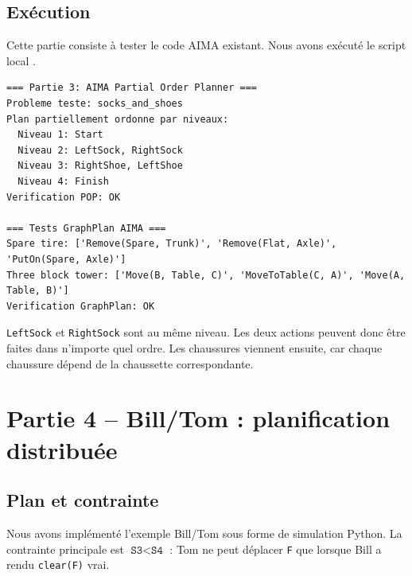 \documentclass[11pt,a4paper]{report}
\begin{document}
\quad{}\quad{}\quad{}

\section{Exécution}

Cette partie consiste à tester le code AIMA existant. Nous avons exécuté le script local .

\begin{lstlisting}
=== Partie 3: AIMA Partial Order Planner ===
Probleme teste: socks_and_shoes
Plan partiellement ordonne par niveaux:
  Niveau 1: Start
  Niveau 2: LeftSock, RightSock
  Niveau 3: RightShoe, LeftShoe
  Niveau 4: Finish
Verification POP: OK

=== Tests GraphPlan AIMA ===
Spare tire: ['Remove(Spare, Trunk)', 'Remove(Flat, Axle)', 'PutOn(Spare, Axle)']
Three block tower: ['Move(B, Table, C)', 'MoveToTable(C, A)', 'Move(A, Table, B)']
Verification GraphPlan: OK
\end{lstlisting}

\begin{resultbox}[Observation]
\texttt{LeftSock} et \texttt{RightSock} sont au même niveau. Les deux actions peuvent donc être faites dans n'importe quel ordre. Les chaussures viennent ensuite, car chaque chaussure dépend de la chaussette correspondante.
\end{resultbox}

\chapter{Partie 4 -- Bill/Tom : planification distribuée}

\quad{}\quad{}\quad{}\quad{}

\section{Plan et contrainte}

Nous avons implémenté l'exemple Bill/Tom sous forme de simulation Python. La contrainte principale est \(\texttt{S3} < \texttt{S4}\) : Tom ne peut déplacer \texttt{F} que lorsque Bill a rendu \texttt{clear(F)} vrai.
\end{document}
